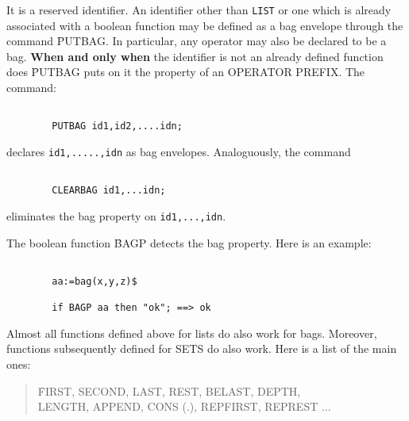 It is a reserved identifier.
An identifier other than \verb+LIST+ or one which is already associated
with a boolean function may be defined as a bag envelope through the
command \f{PUTBAG}. In particular, any operator may also be declared
to be a bag. {\bf When and only when} the identifier is not an already defined
function does \f{PUTBAG} puts on it the property of an OPERATOR PREFIX.
The command:
\begin{verbatim}

        PUTBAG id1,id2,....idn;

\end{verbatim}
declares \verb+id1,.....,idn+ as bag envelopes.
Analoguously, the command
\begin{verbatim}

        CLEARBAG id1,...idn;

\end{verbatim}
eliminates the bag property on \verb+id1,...,idn+.
\item[ii.] The boolean function \f{BAGP} detects the bag property.
Here is an example:
\begin{verbatim}

        aa:=bag(x,y,z)$

        if BAGP aa then "ok"; ==> ok

\end{verbatim}
\item[iii.] Almost all functions defined above for lists
do also work for bags.
Moreover, functions subsequently  defined for  SETS do also work.
Here is a list of the main ones:
\begin{quotation}
\f{FIRST, SECOND, LAST, REST, BELAST, DEPTH,\\
LENGTH, APPEND, CONS (.), REPFIRST, REPREST} $\ldots$
\end{quotation}


